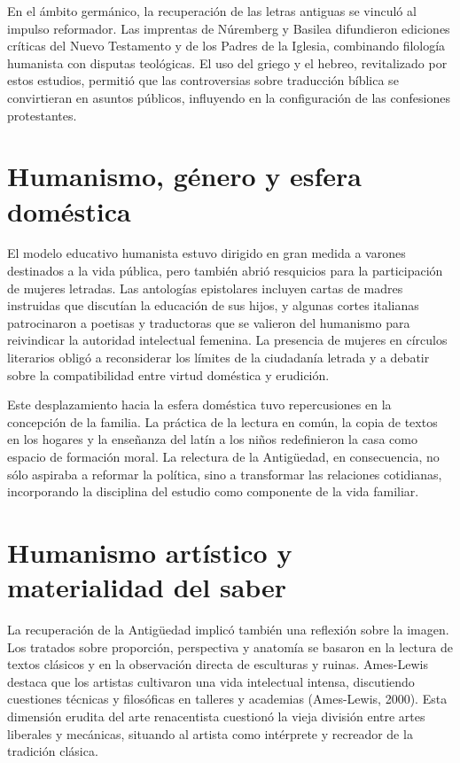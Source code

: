 En el ámbito germánico, la recuperación de las letras antiguas se vinculó al impulso reformador. Las imprentas de Núremberg y Basilea difundieron ediciones críticas del Nuevo Testamento y de los Padres de la Iglesia, combinando filología humanista con disputas teológicas. El uso del griego y el hebreo, revitalizado por estos estudios, permitió que las controversias sobre traducción bíblica se convirtieran en asuntos públicos, influyendo en la configuración de las confesiones protestantes.

\section{Humanismo, género y esfera doméstica}
El modelo educativo humanista estuvo dirigido en gran medida a varones destinados a la vida pública, pero también abrió resquicios para la participación de mujeres letradas. Las antologías epistolares incluyen cartas de madres instruidas que discutían la educación de sus hijos, y algunas cortes italianas patrocinaron a poetisas y traductoras que se valieron del humanismo para reivindicar la autoridad intelectual femenina. La presencia de mujeres en círculos literarios obligó a reconsiderar los límites de la ciudadanía letrada y a debatir sobre la compatibilidad entre virtud doméstica y erudición.

Este desplazamiento hacia la esfera doméstica tuvo repercusiones en la concepción de la familia. La práctica de la lectura en común, la copia de textos en los hogares y la enseñanza del latín a los niños redefinieron la casa como espacio de formación moral. La relectura de la Antigüedad, en consecuencia, no sólo aspiraba a reformar la política, sino a transformar las relaciones cotidianas, incorporando la disciplina del estudio como componente de la vida familiar.

\section{Humanismo artístico y materialidad del saber}
La recuperación de la Antigüedad implicó también una reflexión sobre la imagen. Los tratados sobre proporción, perspectiva y anatomía se basaron en la lectura de textos clásicos y en la observación directa de esculturas y ruinas. Ames-Lewis destaca que los artistas cultivaron una vida intelectual intensa, discutiendo cuestiones técnicas y filosóficas en talleres y academias (Ames-Lewis, 2000). Esta dimensión erudita del arte renacentista cuestionó la vieja división entre artes liberales y mecánicas, situando al artista como intérprete y recreador de la tradición clásica.

